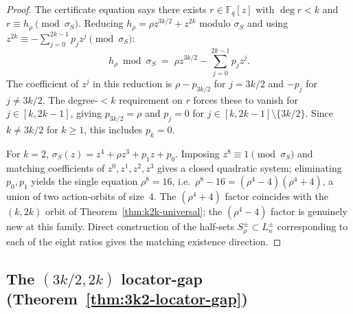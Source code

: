 \documentclass[11pt]{article}
\theoremstyle{definition}
\theoremstyle{remark}
\newcommand{\FF}{\mathbb{F}}
\begin{document}
\begin{proof}
The certificate equation says there exists $r \in \FF_q[z]$ with
$\deg r < k$ and $r \equiv h_\rho \pmod{\sigma_S}$. Reducing $h_\rho =
\rho z^{3k/2} + z^{2k}$ modulo $\sigma_S$ and using
$z^{2k} \equiv -\sum_{j = 0}^{2k - 1} p_j z^j \pmod{\sigma_S}$:
\[
 h_\rho \bmod \sigma_S \;=\; \rho z^{3k/2} - \sum_{j = 0}^{2k - 1} p_j z^j.
\]
The coefficient of $z^j$ in this reduction is $\rho - p_{3k/2}$ for
$j = 3k/2$ and $-p_j$ for $j \neq 3k/2$. The degree-$<\!k$ requirement
on $r$ forces these to vanish for $j \in [k, 2k - 1]$, giving
$p_{3k/2} = \rho$ and $p_j = 0$ for $j \in [k, 2k - 1] \setminus
\{3k/2\}$. Since $k \neq 3k/2$ for $k \geq 1$, this includes $p_k = 0$.

For $k = 2$, $\sigma_S(z) = z^4 + \rho z^3 + p_1 z + p_0$. Imposing
$z^8 \equiv 1 \pmod{\sigma_S}$ and matching coefficients of $z^0, z^1,
z^2, z^3$ gives a closed quadratic system; eliminating $p_0, p_1$
yields the single equation $\rho^8 = 16$, i.e.\ $\rho^8 - 16 = (\rho^4
- 4)(\rho^4 + 4)$, a union of two action-orbits of size~$4$. The
$(\rho^4 + 4)$ factor coincides with the $(k, 2k)$ orbit of
Theorem~\ref{thm:k2k-universal}; the $(\rho^4 - 4)$ factor is genuinely
new at this family. Direct construction of the half-sets
$S_\rho^\pm \subset L_n^\pm$ corresponding to each of the eight ratios
gives the matching existence direction.
\end{proof}

\subsection{The $(3k/2, 2k)$ locator-gap (Theorem~\ref{thm:3k2-locator-gap})}
\label{prf:thm:3k2-locator-gap}
\end{document}
